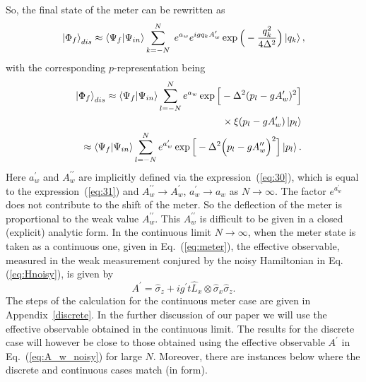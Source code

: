 \documentclass[aps,pra,showpacs,twoside,twocolumn,10pt]{revtex4-1}
\begin{document}
So, the final state of the meter can be rewritten as
\begin{equation}
 \ket{\Phi_f}_{dis} \approx \braket{\Psi_f|\Psi_{in}}\sum_{k=-N}^N\; e^{a_w} e^{igq_kA^{\prime}_w}\exp\Big(-\frac{q_k^2}{4\Delta^2}\Big)\ket{q_k},
\end{equation}
with the corresponding $p$-representation being
\begin{eqnarray}
 &&\ket{\Phi_f}_{dis}\approx \braket{\Psi_f|\Psi_{in}}\sum_{l=-N}^N e^{a_w} \exp\Big[-\Delta^2(p_l-gA^{\prime}_w)^2\Big]\nonumber\\
 &&\phantom{ami hridoyer bolite byakul sudha} \times \xi(p_l-gA_w^{\prime})\ket{p_l}\label{eq:30}\\
 &&\approx \braket{\Psi_f|\Psi_{in}}\sum_{l=-N}^N e^{a_w^{\prime}} \exp\Big[-\Delta^2\Big(p_l-gA^{\prime\prime}_w\Big)^2\Big]\ket{p_l}.\label{eq:31}
\end{eqnarray}
Here $a^{\prime}_w$ and $A^{\prime\prime}_w$ are implicitly defined via the expression~(\ref{eq:30}), which is equal to the  expression~(\ref{eq:31}) and $A^{\prime\prime}_w\rightarrow A^{\prime}_w$, $a^{\prime}_w\rightarrow a_w$ as $N\rightarrow \infty$. The factor $e^{a_w^{\prime}}$ does not contribute to the shift of the meter. So the deflection of the meter is proportional to the weak value $A_w^{\prime\prime}$. This $A_w^{\prime\prime}$ is difficult to be given in a closed (explicit) analytic form. In the continuous limit $N\rightarrow \infty$, when the meter state is taken as a continuous one, given in Eq.~(\ref{eq:meter}), the effective observable, measured in the weak measurement conjured by the noisy Hamiltonian in Eq. ({\ref{eq:Hnoisy}}), is given by
\begin{equation}
    A^{\prime}=\hat{\sigma}_z+ig^\prime t \hat{L}_x\otimes\hat{\sigma}_x\hat{\sigma}_z.
    \label{eq:A_w_noisy}
\end{equation}
The steps of the calculation for the continuous meter case are given in Appendix~\ref{discrete}. In the further discussion of our paper we will use the effective observable obtained in the continuous limit. The results for the discrete case will  however be close to those obtained using the effective observable \(A^{\prime}\) in Eq.~(\ref{eq:A_w_noisy}) for large \(N\). Moreover, there are instances below where the discrete and continuous cases match (in form).
\end{document}
